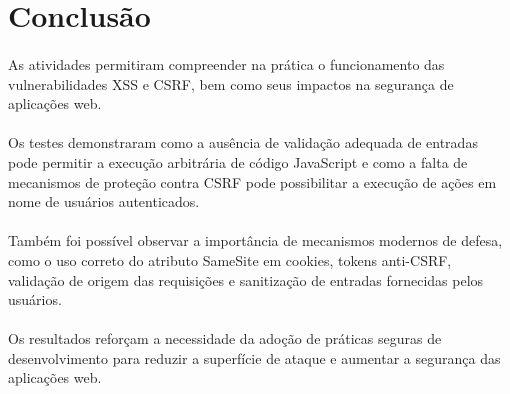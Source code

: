 \section{Conclusão}

\paragraph{}
As atividades permitiram compreender na prática o funcionamento das
vulnerabilidades XSS e CSRF, bem como seus impactos na segurança de aplicações
web.

\paragraph{}
Os testes demonstraram como a ausência de validação adequada de entradas pode
permitir a execução arbitrária de código JavaScript e como a falta de
mecanismos de proteção contra CSRF pode possibilitar a execução de ações em
nome de usuários autenticados.

\paragraph{}
Também foi possível observar a importância de mecanismos modernos de defesa,
como o uso correto do atributo SameSite em cookies, tokens anti-CSRF, validação
de origem das requisições e sanitização de entradas fornecidas pelos usuários.

\paragraph{}
Os resultados reforçam a necessidade da adoção de práticas seguras de
desenvolvimento para reduzir a superfície de ataque e aumentar a segurança das
aplicações web.
